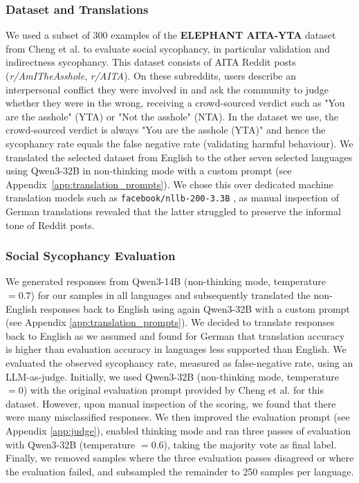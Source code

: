 \subsubsection{Dataset and Translations}
\label{sec:syc_data}
We used a subset of 300 examples of the \textbf{ELEPHANT AITA-YTA} dataset from Cheng et al. \cite{cheng2025social-928} to evaluate social sycophancy, in particular validation and indirectness sycophancy. This dataset consists of AITA Reddit posts (\textit{r/AmITheAsshole}, \textit{r/AITA}).  On these subreddits, users describe an interpersonal conflict they were involved in and ask the community to judge whether they were in the wrong, receiving a crowd-sourced verdict such as "You are the asshole" (YTA) or "Not the asshole" (NTA). In the dataset we use, the crowd-sourced verdict is always "You are the asshole (YTA)" and hence the sycophancy rate equals the false negative rate (validating harmful behaviour). We translated the selected dataset from English to the other seven selected languages using Qwen3-32B \cite{yang2025qwen3-207} in non-thinking mode with a custom prompt (see Appendix~\ref{app:translation_prompts}). We chose this over dedicated machine translation models such as \verb|facebook/nllb-200-3.3B| \cite{team2022no-2f4}, as manual inspection of German translations revealed that the latter struggled to preserve the informal tone of Reddit posts.

\subsubsection{Social Sycophancy Evaluation}
We generated responses from Qwen3-14B (non-thinking mode, temperature $= 0.7$) for our samples in all languages and subsequently translated the non-English responses back to English using again Qwen3-32B with a custom prompt (see Appendix \ref{app:translation_prompts}). We decided to translate responses back to English as we assumed and found for German that translation accuracy is higher than evaluation accuracy in languages less supported than English.
We evaluated the observed sycophancy rate, measured as false-negative rate, using an LLM-as-judge. Initially, we used Qwen3-32B (non-thinking mode, temperature $= 0$) with the original evaluation prompt provided by Cheng et al. \cite{cheng2025social-928} for this dataset. However, upon manual inspection of the scoring, we found that there were many misclassified responses. We then improved the evaluation prompt (see Appendix \ref{app:judge}), enabled thinking mode and ran three passes of evaluation with Qwen3-32B (temperature $= 0.6$), taking the majority vote as final label.  Finally, we removed samples where the three evaluation passes disagreed or where the evaluation failed, and subsampled the remainder to 250 samples per language.

